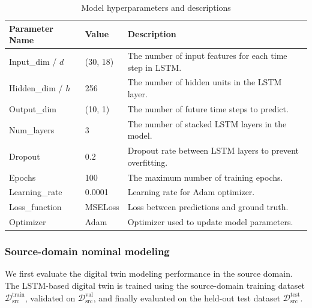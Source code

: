 \documentclass[a4paper,10pt]{cas-sc}%
\begin{document}
\begin{table}[htbp]
	\caption{Model hyperparameters and descriptions}
	\centering
	\label{tab:model_parameters}
	\begin{tabular}{@{}p{}p{}p{}@{}}
		\toprule
 \textbf{Parameter Name} & \textbf{Value} & \textbf{Description} \\
		\midrule
		Input\_dim / \(d\) & (30, 18)       & The number of input features for each time step in LSTM. \\
		Hidden\_dim / \(h\) & 256            & The number of hidden units in the LSTM layer.            \\
		Output\_dim & (10, 1)        & The number of future time steps to predict.              \\
		Num\_layers & 3              & The number of stacked LSTM layers in the model.          \\
		Dropout & 0.2            & Dropout rate between LSTM layers to prevent overfitting. \\
		Epochs & 100            & The maximum number of training epochs.                   \\
		Learning\_rate & 0.0001         & Learning rate for Adam optimizer.                        \\
		Loss\_function & MSELoss        & Loss between predictions and ground truth.               \\
		Optimizer & Adam           & Optimizer used to update model parameters.               \\
		\bottomrule
	\end{tabular}
\end{table}



\subsubsection{Source-domain nominal modeling}

We first evaluate the digital twin modeling performance in the source domain. The LSTM-based digital twin is trained using the source-domain training dataset \( \mathcal{D}_{\text{src}}^{\text{train}} \), validated on \( \mathcal{D}_{\text{src}}^{\text{val}} \), and finally evaluated on the held-out test dataset \( \mathcal{D}_{\text{src}}^{\text{test}} \).
\end{document}
